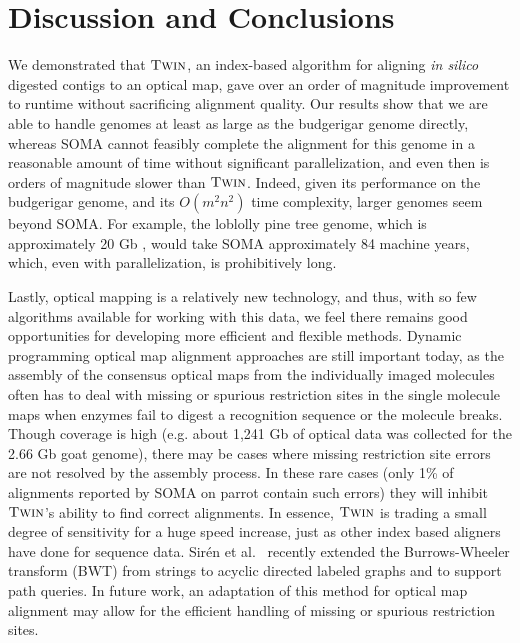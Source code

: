 \section{Discussion and Conclusions}
\label{sec-discussion}

We demonstrated that $\mbox{\rm {\sc Twin}}$, an index-based algorithm for aligning {\em in silico} digested contigs to an optical map, gave over an order of magnitude improvement to runtime without sacrificing alignment quality. Our results show that we are able to handle genomes at least as large as the budgerigar genome directly, whereas SOMA cannot feasibly complete the alignment for this genome in a reasonable amount of time without significant parallelization, and even then is orders of magnitude slower than $\mbox{\rm {\sc Twin}}$. Indeed, given its performance on the budgerigar genome, and its $O(m^2 n^2)$ time complexity, larger genomes seem beyond SOMA.  For example, the loblolly pine tree genome, which is approximately 20 Gb \cite{pinetree}, would take SOMA approximately 84 machine years, which, even with parallelization, is prohibitively long.

Lastly, optical mapping is a relatively new technology, and thus, with so few algorithms available for working with this data, we feel there remains good opportunities for developing more efficient and flexible methods. Dynamic programming optical map alignment approaches are still important today, as the assembly of the consensus optical maps from the individually imaged molecules often has to deal with missing or spurious restriction sites in the single molecule maps when enzymes fail to digest a recognition sequence or the molecule breaks.  Though coverage is high (e.g. about 1,241 Gb of optical data was collected for the 2.66 Gb goat genome), there may be cases where missing restriction site errors are not resolved by the assembly process.   In these rare cases (only 1\% of alignments reported by SOMA on parrot contain such errors) they will inhibit $\mbox{\rm {\sc Twin}}$'s ability to find correct alignments.  In essence, $\mbox{\rm {\sc Twin}}$ is trading a small degree of sensitivity for a huge speed increase, just as other index based aligners have done for sequence data.  Sir\'{e}n et al.~\cite{dag_method} recently extended the Burrows-Wheeler transform (BWT) from strings to acyclic directed labeled graphs and to support path queries. In future work, an adaptation of this method for optical map alignment may allow for the efficient handling of missing or spurious restriction sites.

